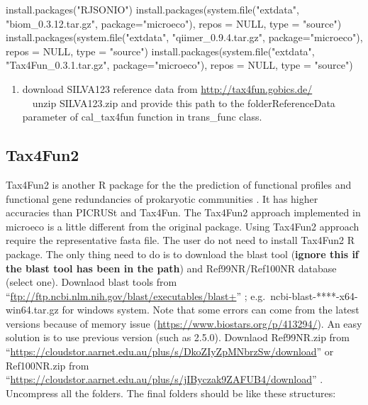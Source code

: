 \documentclass[
]{book}
\newenvironment{Shaded}{\begin{snugshade}}{\end{snugshade}}
\newcommand{\AttributeTok}[1]{\textcolor[rgb]{0.77,0.63,0.00}{#1}}
\newcommand{\ConstantTok}[1]{\textcolor[rgb]{0.00,0.00,0.00}{#1}}
\newcommand{\FunctionTok}[1]{\textcolor[rgb]{0.00,0.00,0.00}{#1}}
\newcommand{\NormalTok}[1]{#1}
\newcommand{\StringTok}[1]{\textcolor[rgb]{0.31,0.60,0.02}{#1}}
\providecommand{\tightlist}{%
  \setlength{\itemsep}{0pt}\setlength{\parskip}{0pt}}
\begin{document}
\begin{Shaded}
\begin{Highlighting}[]
\FunctionTok{install.packages}\NormalTok{(}\StringTok{"RJSONIO"}\NormalTok{)}
\FunctionTok{install.packages}\NormalTok{(}\FunctionTok{system.file}\NormalTok{(}\StringTok{"extdata"}\NormalTok{, }\StringTok{"biom\_0.3.12.tar.gz"}\NormalTok{, }\AttributeTok{package=}\StringTok{"microeco"}\NormalTok{), }\AttributeTok{repos =} \ConstantTok{NULL}\NormalTok{, }\AttributeTok{type =} \StringTok{"source"}\NormalTok{)}
\FunctionTok{install.packages}\NormalTok{(}\FunctionTok{system.file}\NormalTok{(}\StringTok{"extdata"}\NormalTok{, }\StringTok{"qiimer\_0.9.4.tar.gz"}\NormalTok{, }\AttributeTok{package=}\StringTok{"microeco"}\NormalTok{), }\AttributeTok{repos =} \ConstantTok{NULL}\NormalTok{, }\AttributeTok{type =} \StringTok{"source"}\NormalTok{)}
\FunctionTok{install.packages}\NormalTok{(}\FunctionTok{system.file}\NormalTok{(}\StringTok{"extdata"}\NormalTok{, }\StringTok{"Tax4Fun\_0.3.1.tar.gz"}\NormalTok{, }\AttributeTok{package=}\StringTok{"microeco"}\NormalTok{), }\AttributeTok{repos =} \ConstantTok{NULL}\NormalTok{, }\AttributeTok{type =} \StringTok{"source"}\NormalTok{)}
\end{Highlighting}
\end{Shaded}

\begin{enumerate}
\def\labelenumi{\arabic{enumi}.}
\setcounter{enumi}{1}
\tightlist
\item
  download SILVA123 reference data from \url{http://tax4fun.gobics.de/}\\
  　unzip SILVA123.zip and provide this path to the folderReferenceData parameter of cal\_tax4fun function in trans\_func class.
\end{enumerate}

\hypertarget{tax4fun2}{%
\subsection{Tax4Fun2}\label{tax4fun2}}

Tax4Fun2 is another R package for the the prediction of functional profiles and functional gene redundancies of prokaryotic communities \citep{Wemheuer_Tax4Fun2_2020}.
It has higher accuracies than PICRUSt and Tax4Fun. The Tax4Fun2 approach implemented in microeco is a little different from the original package.
Using Tax4Fun2 approach require the representative fasta file.
The user do not need to install Tax4Fun2 R package.
The only thing need to do is to download the blast tool (\textbf{ignore this if the blast tool has been in the path}) and Ref99NR/Ref100NR database (select one).
Downlaod blast tools from ``\url{ftp://ftp.ncbi.nlm.nih.gov/blast/executables/blast+}'' ; e.g.~ncbi-blast-****-x64-win64.tar.gz for windows system.
Note that some errors can come from the latest versions because of memory issue (\url{https://www.biostars.org/p/413294/}).
An easy solution is to use previous version (such as 2.5.0).
Downlaod Ref99NR.zip from ``\url{https://cloudstor.aarnet.edu.au/plus/s/DkoZIyZpMNbrzSw/download}'' or Ref100NR.zip from ``\url{https://cloudstor.aarnet.edu.au/plus/s/jIByczak9ZAFUB4/download}'' .
Uncompress all the folders. The final folders should be like these structures:
\end{document}
